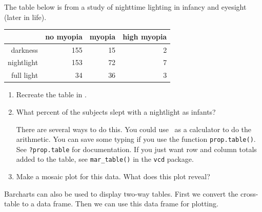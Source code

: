 \begin{problem}
The table below is from a study of nighttime lighting in infancy and 
eyesight (later in life).  
\begin{center}
\begin{tabular}{rrrr}
  \hline
 & no myopia & myopia & high myopia \\ 
  \hline
darkness & 155 & 15 & 2 \\ 
  nightlight & 153 & 72 & 7 \\ 
  full light & 34 & 36 & 3 \\ 
   \hline
\end{tabular}
\end{center}

\begin{enumerate}
\item
Recreate the table in \Rstudio.  %
\item
What percent of the subjects slept with a nightlight as infants?

There are several ways to do this.  You could use \R\ as a calculator to do the arithmetic.
You can save some typing if you use the function \verb!prop.table()!.  See
\verb!?prop.table! for documentation.
If you just want row and column totals added to the table, see \verb!mar_table()!
in the \verb!vcd! package.
\item
Make a mosaic plot for this data.  What does this plot reveal?
\end{enumerate}
\end{problem}

Barcharts can also be used to display two-way tables.  First we convert
the cross-table to a data frame.
Then we can use this data frame for plotting.

